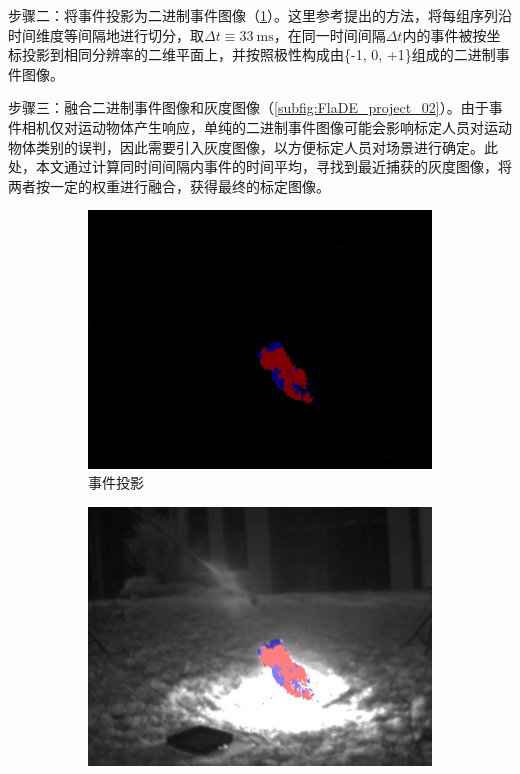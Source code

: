 步骤二：将事件投影为二进制事件图像（\ref{subfig:FlaDE_project_01}）。这里参考\citet{kogler2009bio}提出的方法，将每组序列沿时间维度等间隔地进行切分，取$\Delta{t} \equiv \SI{33}{\milli\second}$，在同一时间间隔$\Delta{t}$内的事件被按坐标投影到相同分辨率的二维平面上，并按照极性构成由\{-1, 0, +1\}组成的二进制事件图像。

步骤三：融合二进制事件图像和灰度图像（\ref{subfig:FlaDE_project_02}）。由于事件相机仅对运动物体产生响应，单纯的二进制事件图像可能会影响标定人员对运动物体类别的误判，因此需要引入灰度图像，以方便标定人员对场景进行确定。此处，本文通过计算同时间间隔内事件的时间平均，寻找到最近捕获的灰度图像，将两者按一定的权重进行融合，获得最终的标定图像。

\begin{figure}[ht]
    \centering
    \begin{subfigure}{0.49\textwidth}
        \centering
        \includegraphics[width=\textwidth]{figures/dataset_project_01.png}
        \caption{事件投影}
        \label{subfig:FlaDE_project_01}
    \end{subfigure}
    \hfill
    \begin{subfigure}{0.49\textwidth}
        \centering
        \includegraphics[width=\textwidth]{figures/dataset_project_02.png}

\end{subfigure}
\end{figure}
